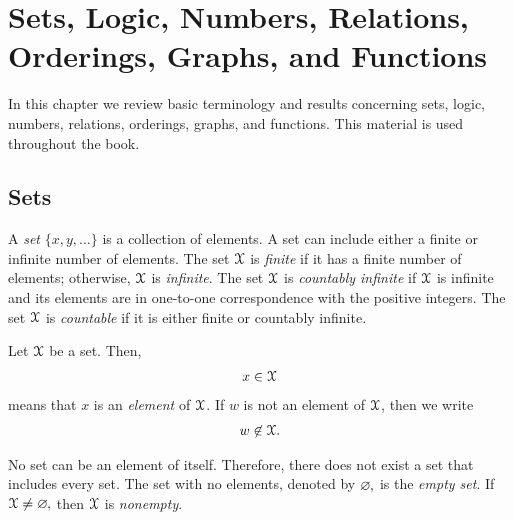 \chapter{Sets, Logic, Numbers, Relations, Orderings, Graphs, and Functions}












\indent\indent In this chapter we review basic terminology
and results concerning sets, logic, numbers, relations, orderings, graphs, and functions. This material is used throughout the book.








\section{Sets}


A {\it set} $\{x,y,\ldots\}$ is a collection of elements.
A set can include either a finite or infinite number of elements.
The set ${\mathcal X}$ is {\it finite} if it has a finite number of elements; otherwise, ${\mathcal X}$ is {\it infinite}.
%
The set ${\mathcal X}$ is {\it countably infinite} if ${\mathcal X}$ is infinite and its elements are in one-to-one correspondence with the positive integers. The set ${\mathcal X}$ is {\it countable} if it is either finite or countably infinite.

Let ${\mathcal X}$ be a set.
Then, \begin{align}x\in {\mathcal X}\end{align} means that $x$ is an {\it element}
\label{insym}%
%
of ${\mathcal X}$. If $w$ is not an element of ${\mathcal X}$, then we write
\begin{align}w\not\in {\mathcal X}.\end{align}
\label{notinsym}

No set can be an element of itself.  Therefore, there does not exist a set that includes every set.  The set with no elements, denoted by $\varnothing\mspace{-1mu},$ is the {\it empty set}.
%
\label{varnothingsym}%
%
%
If ${\mathcal X}\not=\varnothing\mspace{-1mu},$ then ${\mathcal X}$ is {\it nonempty}.

